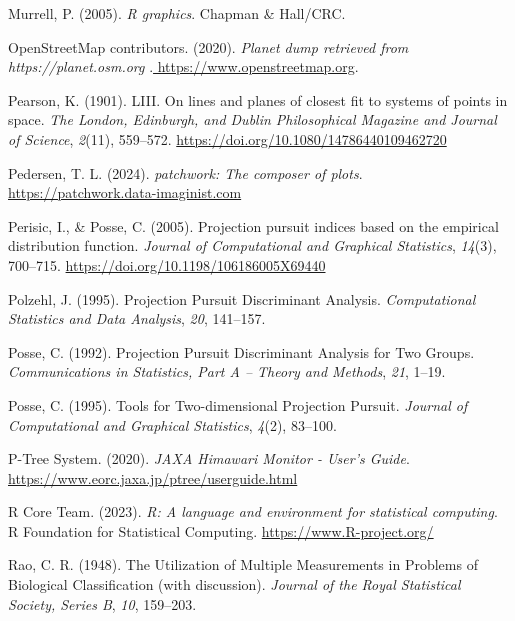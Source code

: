 \documentclass[
  letterpaper,
]{krantz}
\newlength{\cslhangindent}
\newenvironment{CSLReferences}[2] %
 {\begin{list}{}{%
  \setlength{\itemindent}{0pt}
  \setlength{\leftmargin}{0pt}
  \setlength{\parsep}{0pt}
  \ifodd #1
   \setlength{\leftmargin}{\cslhangindent}
   \setlength{\itemindent}{-1\cslhangindent}
  \fi
  \setlength{\itemsep}{#2\baselineskip}}}
 {\end{list}}
\begin{document}
\begin{CSLReferences}{1}{0}
Murrell, P. (2005). \emph{R graphics}. Chapman \& Hall/CRC.

OpenStreetMap contributors. (2020). \emph{{Planet dump retrieved from
https://planet.osm.org
}}.\href{\%20https://www.openstreetmap.org\%20}{ https://www.openstreetmap.org}.

Pearson, K. (1901). LIII. On lines and planes of closest fit to systems
of points in space. \emph{The London, Edinburgh, and Dublin
Philosophical Magazine and Journal of Science}, \emph{2}(11), 559--572.
\url{https://doi.org/10.1080/14786440109462720}

Pedersen, T. L. (2024). \emph{{patchwork}: The composer of plots}.
\url{https://patchwork.data-imaginist.com}

Perisic, I., \& Posse, C. (2005). Projection pursuit indices based on
the empirical distribution function. \emph{Journal of Computational and
Graphical Statistics}, \emph{14}(3), 700--715.
\url{https://doi.org/10.1198/106186005X69440}

Polzehl, J. (1995). Projection {P}ursuit {D}iscriminant {A}nalysis.
\emph{Computational Statistics and Data Analysis}, \emph{20}, 141--157.

Posse, C. (1992). Projection {P}ursuit {D}iscriminant {A}nalysis for
{T}wo {G}roups. \emph{Communications in Statistics, Part A -- Theory and
Methods}, \emph{21}, 1--19.

Posse, C. (1995). Tools for {T}wo-dimensional {P}rojection {P}ursuit.
\emph{Journal of Computational and Graphical Statistics}, \emph{4}(2),
83--100.

P-Tree System. (2020). \emph{{JAXA Himawari Monitor - User's Guide}}.
\url{https://www.eorc.jaxa.jp/ptree/userguide.html}

R Core Team. (2023). \emph{R: A language and environment for statistical
computing}. R Foundation for Statistical Computing.
\url{https://www.R-project.org/}

Rao, C. R. (1948). The {U}tilization of {M}ultiple {M}easurements in
{P}roblems of {B}iological {C}lassification (with discussion).
\emph{Journal of the Royal Statistical Society, Series B}, \emph{10},
159--203.


\end{CSLReferences}
\end{document}
